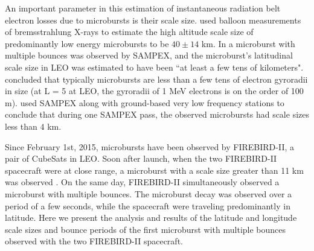 \documentclass[draft, linenumbers]{agujournal}
\begin{document}
 An important parameter in this estimation of instantaneous radiation belt electron losses due to microbursts is their scale size. \citet{Parks1967} used balloon measurements of bremsstrahlung X-rays to estimate the high altitude scale size of predominantly low energy microbursts to be $40 \pm 14$ km. In \citet{Blake1996} a microburst with multiple bounces was observed by SAMPEX, and the microburst's latitudinal scale size in LEO was estimated to have been ``at least a few tens of kilometers". \citet{Blake1996} concluded that typically microbursts are less than a few tens of electron gyroradii in size (at L = 5 at LEO, the gyroradii of 1 MeV electrons is on the order of 100 m). \citet{Dietrich2010} used SAMPEX along with ground-based very low frequency stations to conclude that during one SAMPEX pass, the observed microbursts had scale sizes less than $4$ km.

Since February 1st, 2015, microbursts have been observed by FIREBIRD-II, a pair of CubeSats in LEO. Soon after launch, when the two FIREBIRD-II spacecraft were at close range, a microburst with a scale size greater than 11 km was observed \citep{Crew2016}. On the same day, FIREBIRD-II simultaneously observed a microburst with multiple bounces. The microburst decay was observed over a period of a few seconds, while the spacecraft were traveling predominantly in latitude. Here we present the analysis and results of the latitude and longitude scale sizes and bounce periods of the first microburst with multiple bounces observed with the two FIREBIRD-II spacecraft.
\end{document}

